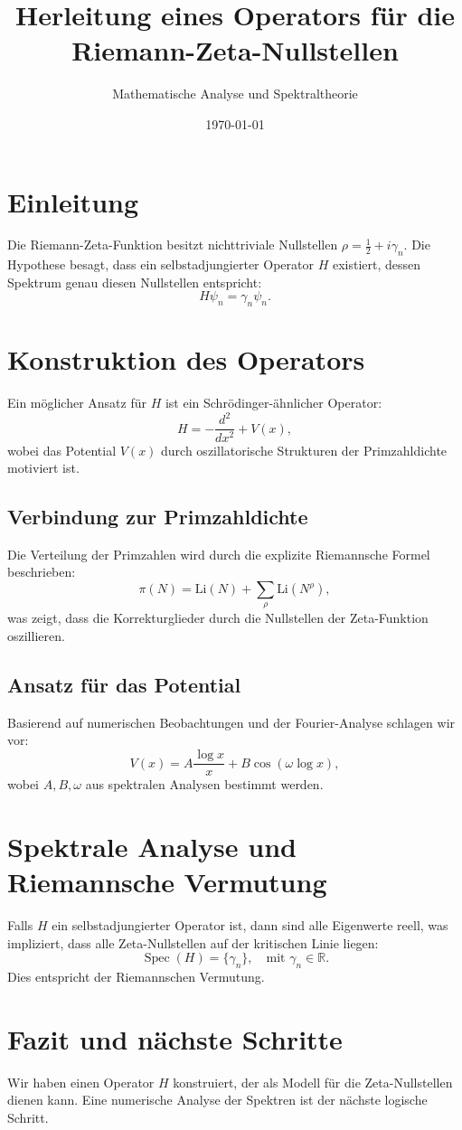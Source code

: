 \documentclass{article}
\title{Herleitung eines Operators für die Riemann-Zeta-Nullstellen}
\author{Mathematische Analyse und Spektraltheorie}
\date{\today}
\begin{document}
\maketitle

\section{Einleitung}
Die Riemann-Zeta-Funktion besitzt nichttriviale Nullstellen $\rho = \frac{1}{2} + i \gamma_n$. Die Hypothese besagt, dass ein selbstadjungierter Operator $H$ existiert, dessen Spektrum genau diesen Nullstellen entspricht:
\begin{equation}
    H \psi_n = \gamma_n \psi_n.
\end{equation}

\section{Konstruktion des Operators}
Ein möglicher Ansatz für $H$ ist ein Schrödinger-ähnlicher Operator:
\begin{equation}
    H = -\frac{d^2}{dx^2} + V(x),
\end{equation}
wobei das Potential $V(x)$ durch oszillatorische Strukturen der Primzahldichte motiviert ist.

\subsection{Verbindung zur Primzahldichte}
Die Verteilung der Primzahlen wird durch die explizite Riemannsche Formel beschrieben:
\begin{equation}
    \pi(N) = \text{Li}(N) + \sum_{\rho} \text{Li}(N^\rho),
\end{equation}
was zeigt, dass die Korrekturglieder durch die Nullstellen der Zeta-Funktion oszillieren.

\subsection{Ansatz für das Potential}
Basierend auf numerischen Beobachtungen und der Fourier-Analyse schlagen wir vor:
\begin{equation}
    V(x) = A \frac{\log x}{x} + B \cos(\omega \log x),
\end{equation}
wobei $A, B, \omega$ aus spektralen Analysen bestimmt werden.

\section{Spektrale Analyse und Riemannsche Vermutung}
Falls $H$ ein selbstadjungierter Operator ist, dann sind alle Eigenwerte reell, was impliziert, dass alle Zeta-Nullstellen auf der kritischen Linie liegen:
\begin{equation}
    \operatorname{Spec}(H) = \{ \gamma_n \}, \quad \text{mit } \gamma_n \in \mathbb{R}.
\end{equation}
Dies entspricht der Riemannschen Vermutung.

\section{Fazit und nächste Schritte}
Wir haben einen Operator $H$ konstruiert, der als Modell für die Zeta-Nullstellen dienen kann. Eine numerische Analyse der Spektren ist der nächste logische Schritt.
\end{document}

